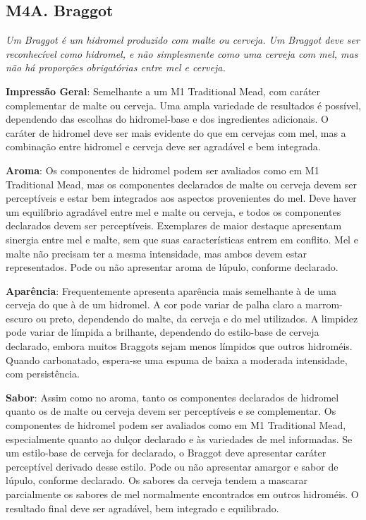 \subsection*{M4A. Braggot}

\textit{Um Braggot é um hidromel produzido com malte ou cerveja. Um Braggot deve ser reconhecível como hidromel, e não simplesmente como uma cerveja com mel, mas não há proporções obrigatórias entre mel e cerveja.}

\textbf{Impressão Geral}: Semelhante a um M1 Traditional Mead, com caráter complementar de malte ou cerveja. Uma ampla variedade de resultados é possível, dependendo das escolhas do hidromel-base e dos ingredientes adicionais. O caráter de hidromel deve ser mais evidente do que em cervejas com mel, mas a combinação entre hidromel e cerveja deve ser agradável e bem integrada.


\textbf{Aroma}: Os componentes de hidromel podem ser avaliados como em M1 Traditional Mead, mas os componentes declarados de malte ou cerveja devem ser perceptíveis e estar bem integrados aos aspectos provenientes do mel. Deve haver um equilíbrio agradável entre mel e malte ou cerveja, e todos os componentes declarados devem ser perceptíveis. Exemplares de maior destaque apresentam sinergia entre mel e malte, sem que suas características entrem em conflito. Mel e malte não precisam ter a mesma intensidade, mas ambos devem estar representados. Pode ou não apresentar aroma de lúpulo, conforme declarado.

\textbf{Aparência}: Frequentemente apresenta aparência mais semelhante à de uma cerveja do que à de um hidromel. A cor pode variar de palha claro a marrom-escuro ou preto, dependendo do malte, da cerveja e do mel utilizados. A limpidez pode variar de límpida a brilhante, dependendo do estilo-base de cerveja declarado, embora muitos Braggots sejam menos límpidos que outros hidroméis. Quando carbonatado, espera-se uma espuma de baixa a moderada intensidade, com persistência.

\textbf{Sabor}: Assim como no aroma, tanto os componentes declarados de hidromel quanto os de malte ou cerveja devem ser perceptíveis e se complementar. Os componentes de hidromel podem ser avaliados como em M1 Traditional Mead, especialmente quanto ao dulçor declarado e às variedades de mel informadas. Se um estilo-base de cerveja for declarado, o Braggot deve apresentar caráter perceptível derivado desse estilo. Pode ou não apresentar amargor e sabor de lúpulo, conforme declarado. Os sabores da cerveja tendem a mascarar parcialmente os sabores de mel normalmente encontrados em outros hidroméis. O resultado final deve ser agradável, bem integrado e equilibrado.

